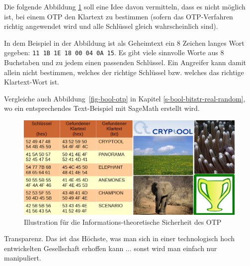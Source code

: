 \begin{refsegment}
\begin{itemize}
\end{itemize}


\newpage
Die folgende Abbildung \ref{cm_Figure_OTP-demo-pictures} soll eine Idee davon vermitteln, dass es nicht möglich ist, bei einem OTP den Klartext zu bestimmen (sofern das OTP-Verfahren richtig angewendet wird und alle Schlüssel gleich wahrscheinlich sind).

In dem Beispiel in der Abbildung ist als Geheimtext ein 8 Zeichen langes Wort gegeben:
\texttt{11 1B 1E 18 00 04 0A 15}.
Es gibt viele sinnvolle Worte aus 8 Buchstaben und zu jedem einen passenden Schlüssel.
Ein Angreifer kann damit allein nicht bestimmen, welches der richtige Schlüssel bzw.
welches das richtige Klartext-Wort ist.

Vergleiche auch Abbildung~\ref{fig-bool-otp} in Kapitel \ref{s-bool-bitstr-real-random},
wo ein entsprechendes Text-Beispiel mit SageMath erstellt wird.
\begin{figure}[ht]
\begin{center}
\includegraphics[scale=0.54]{figures/OTP-demo-pictures-de.png}
\caption[Illustration für die Informations-theoretische Sicherheit des OTP]
        {Illustration für die Informations-theoretische Sicherheit des OTP\footnotemark}
\label{cm_Figure_OTP-demo-pictures}
\end{center}
\end{figure}





\newpage

\begin{ctsquote}
\glqq Transparenz. Das ist das Höchste, was man sich in einer technologisch hoch entwickelten Gesellschaft erhoffen kann ... sonst wird man einfach nur manipuliert.\grqq
\caption[Daniel Suarez]{Daniel Suarez\footnotemark}
\end{ctsquote}
\addtocounter{footnote}{0}


\end{refsegment}
